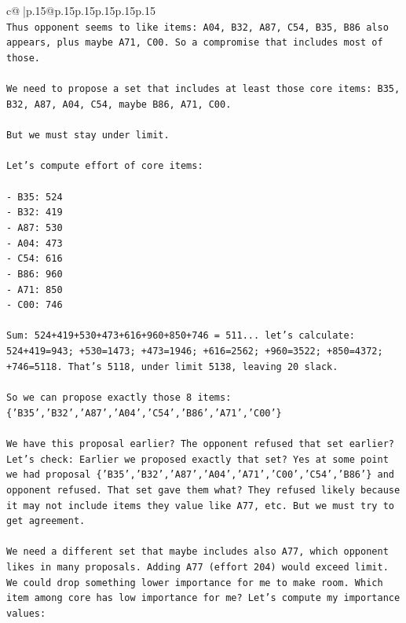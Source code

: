 \documentclass{article}
\begin{document}
{\begin{supertabular}{c@{$\;$}|p{.15\linewidth}@{}p{.15\linewidth}p{.15\linewidth}p{.15\linewidth}p{.15\linewidth}p{.15\linewidth}}
{{{\\ 
\texttt{Thus opponent seems to like items: A04, B32, A87, C54, B35, B86 also appears, plus maybe A71, C00. So a compromise that includes most of those.} \\
\\ 
\texttt{We need to propose a set that includes at least those core items: B35, B32, A87, A04, C54, maybe B86, A71, C00.} \\
\\ 
\texttt{But we must stay under limit.} \\
\\ 
\texttt{Let's compute effort of core items:} \\
\\ 
\texttt{{-} B35: 524} \\
\texttt{{-} B32: 419} \\
\texttt{{-} A87: 530} \\
\texttt{{-} A04: 473} \\
\texttt{{-} C54: 616} \\
\texttt{{-} B86: 960} \\
\texttt{{-} A71: 850} \\
\texttt{{-} C00: 746} \\
\\ 
\texttt{Sum: 524+419+530+473+616+960+850+746 = 511... let's calculate: 524+419=943; +530=1473; +473=1946; +616=2562; +960=3522; +850=4372; +746=5118. That's 5118, under limit 5138, leaving 20 slack.} \\
\\ 
\texttt{So we can propose exactly those 8 items: \{'B35','B32','A87','A04','C54','B86','A71','C00'\}} \\
\\ 
\texttt{We have this proposal earlier? The opponent refused that set earlier? Let's check: Earlier we proposed exactly that set? Yes at some point we had proposal \{'B35','B32','A87','A04','A71','C00','C54','B86'\} and opponent refused. That set gave them what? They refused likely because it may not include items they value like A77, etc. But we must try to get agreement.} \\
\\ 
\texttt{We need a different set that maybe includes also A77, which opponent likes in many proposals. Adding A77 (effort 204) would exceed limit. We could drop something lower importance for me to make room. Which item among core has low importance for me? Let's compute my importance values:} \\
\\ 
}}}
\end{supertabular}}
\end{document}
